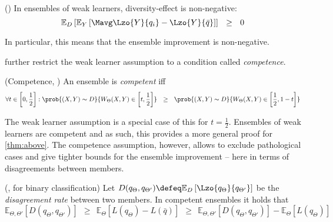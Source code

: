 \documentclass[../main.tex]{subfiles}
\begin{document}
\begin{theorem} (\cite{wood23}) In ensembles of weak learners, diversity-effect is non-negative:
$$
\mathbb{E}_{D}\left[ 
\mathbb{E}_{Y}\left[ 
\Mavg \Lzo{Y}{q_{i}} - \Lzo{Y}{\bar{q}}
\right] 
\right] 
~ ~ \geq ~ ~ 0
$$
\end{theorem}

In particular, this means that the ensemble improvement is non-negative. 

\cite{theisen} further restrict the weak learner assumption to a condition called \textit{competence}.
\begin{definition} (Competence, \cite{theisen})
An ensemble is \textit{competent} iff
$$
\forall t  \in \left[ 0, \frac{1}{2} \right] : \prob{(X,Y) \sim D}{ W_{\Theta}(X,Y) \in \left[ t, \frac{1}{2} \right]} 
~ ~ \geq ~ ~
\prob{(X,Y)\sim D}{W_{\Theta}(X,Y) \in \left[ \frac{1}{2}, 1-t \right]}
$$
\end{definition}
The weak learner assumption is a special case of this for $t = \frac{1}{2}$. Ensembles of weak learners are competent and as such, this provides a more general proof for \ref{thm:above}. The competence assumption, however, allows to exclude pathological cases and give tighter bounds for the ensemble improvement -- here in terms of disagreements between members.
\begin{theorem} (\cite{theisen}, for binary classification) Let $D(q_{\Theta}, q_{\Theta'}) \defeq \mathbb{E}_{D}\left[ \Lzo{q_{\Theta}}{q_{\Theta'}} \right]$ be the \textit{disagreement rate} between two members. In competent ensembles it holds that
$$
\mathbb{E}_{\Theta, \Theta'}\left[ D(q_{\Theta}, q_{\Theta'}) \right] 
~ ~  \geq ~ ~ 
\mathbb{E}_{\Theta}\left[ L(q_{\Theta}) - L(\bar{q}) \right] 
~ ~  \geq ~ ~ 
\mathbb{E}_{\Theta, \Theta'}\left[ D(q_{\Theta}, q_{\Theta'}) \right] - \mathbb{E}_{\Theta}\left[ L(q_{\Theta}) \right]  
$$
\end{theorem}




\end{document}
